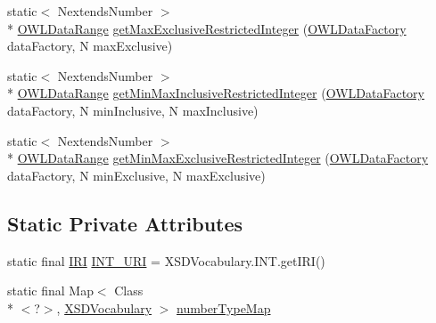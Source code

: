 \begin{DoxyCompactItemize}
\item 
static$<$ Nextends\-Number $>$\\*
 \hyperlink{interfaceorg_1_1semanticweb_1_1owlapi_1_1model_1_1_o_w_l_data_range}{O\-W\-L\-Data\-Range} \hyperlink{classorg_1_1semanticweb_1_1owlapi_1_1util_1_1_o_w_l_data_util_aa185039ed53934eec8b1c64955963a73}{get\-Max\-Exclusive\-Restricted\-Integer} (\hyperlink{interfaceorg_1_1semanticweb_1_1owlapi_1_1model_1_1_o_w_l_data_factory}{O\-W\-L\-Data\-Factory} data\-Factory, N max\-Exclusive)
\item 
static$<$ Nextends\-Number $>$\\*
 \hyperlink{interfaceorg_1_1semanticweb_1_1owlapi_1_1model_1_1_o_w_l_data_range}{O\-W\-L\-Data\-Range} \hyperlink{classorg_1_1semanticweb_1_1owlapi_1_1util_1_1_o_w_l_data_util_a9370b5c5f9946ea49336f6e9ffc9ce3b}{get\-Min\-Max\-Inclusive\-Restricted\-Integer} (\hyperlink{interfaceorg_1_1semanticweb_1_1owlapi_1_1model_1_1_o_w_l_data_factory}{O\-W\-L\-Data\-Factory} data\-Factory, N min\-Inclusive, N max\-Inclusive)
\item 
static$<$ Nextends\-Number $>$\\*
 \hyperlink{interfaceorg_1_1semanticweb_1_1owlapi_1_1model_1_1_o_w_l_data_range}{O\-W\-L\-Data\-Range} \hyperlink{classorg_1_1semanticweb_1_1owlapi_1_1util_1_1_o_w_l_data_util_a52acb6e88795b77e8e94e57517003887}{get\-Min\-Max\-Exclusive\-Restricted\-Integer} (\hyperlink{interfaceorg_1_1semanticweb_1_1owlapi_1_1model_1_1_o_w_l_data_factory}{O\-W\-L\-Data\-Factory} data\-Factory, N min\-Exclusive, N max\-Exclusive)
\end{DoxyCompactItemize}
\subsection*{Static Private Attributes}
\begin{DoxyCompactItemize}
\item 
static final \hyperlink{classorg_1_1semanticweb_1_1owlapi_1_1model_1_1_i_r_i}{I\-R\-I} \hyperlink{classorg_1_1semanticweb_1_1owlapi_1_1util_1_1_o_w_l_data_util_a121f400b33c6e04f475a9fd3073c8f18}{I\-N\-T\-\_\-\-U\-R\-I} = X\-S\-D\-Vocabulary.\-I\-N\-T.\-get\-I\-R\-I()
\item 
static final Map$<$ Class\\*
$<$?$>$, \hyperlink{enumorg_1_1semanticweb_1_1owlapi_1_1vocab_1_1_x_s_d_vocabulary}{X\-S\-D\-Vocabulary} $>$ \hyperlink{classorg_1_1semanticweb_1_1owlapi_1_1util_1_1_o_w_l_data_util_a836b4be0ee00df5959fbaa1de840f15d}{number\-Type\-Map}
\end{DoxyCompactItemize}


